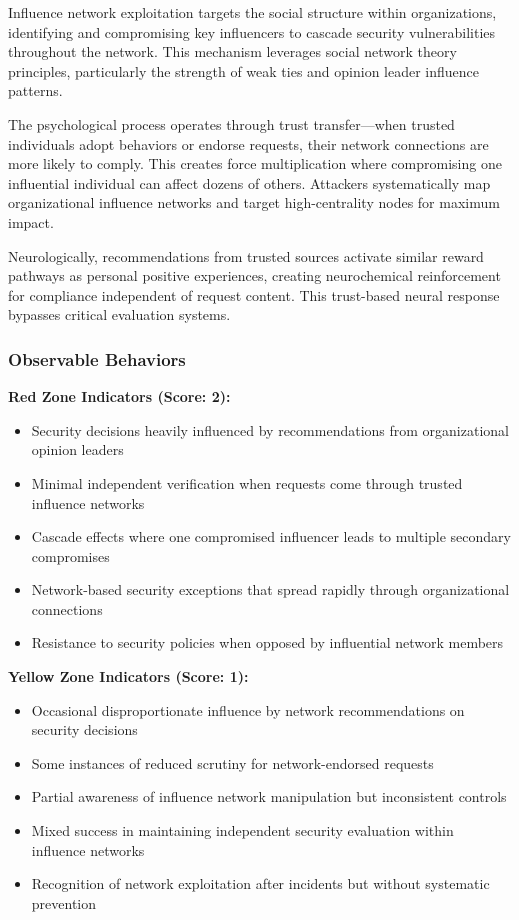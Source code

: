 \documentclass[11pt,a4paper]{article}
\begin{document}
Influence network exploitation targets the social structure within organizations, identifying and compromising key influencers to cascade security vulnerabilities throughout the network. This mechanism leverages social network theory principles, particularly the strength of weak ties\cite{granovetter1973} and opinion leader influence patterns\cite{katz1955}.

The psychological process operates through trust transfer—when trusted individuals adopt behaviors or endorse requests, their network connections are more likely to comply\cite{milgram1967}. This creates force multiplication where compromising one influential individual can affect dozens of others. Attackers systematically map organizational influence networks and target high-centrality nodes for maximum impact.

Neurologically, recommendations from trusted sources activate similar reward pathways as personal positive experiences, creating neurochemical reinforcement for compliance independent of request content\cite{klucharev2009}. This trust-based neural response bypasses critical evaluation systems.

\subsubsection{Observable Behaviors}

\textbf{Red Zone Indicators (Score: 2):}
\begin{itemize}
\item Security decisions heavily influenced by recommendations from organizational opinion leaders
\item Minimal independent verification when requests come through trusted influence networks
\item Cascade effects where one compromised influencer leads to multiple secondary compromises
\item Network-based security exceptions that spread rapidly through organizational connections
\item Resistance to security policies when opposed by influential network members
\end{itemize}

\textbf{Yellow Zone Indicators (Score: 1):}
\begin{itemize}
\item Occasional disproportionate influence by network recommendations on security decisions
\item Some instances of reduced scrutiny for network-endorsed requests
\item Partial awareness of influence network manipulation but inconsistent controls
\item Mixed success in maintaining independent security evaluation within influence networks
\item Recognition of network exploitation after incidents but without systematic prevention
\end{itemize}
\end{document}
